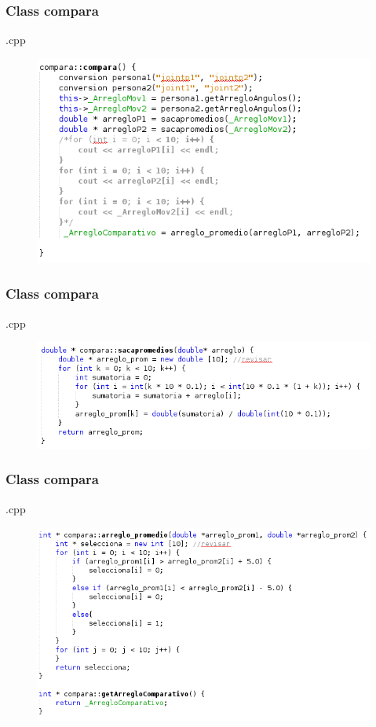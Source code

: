 \documentclass{beamer}
\begin{document}

\begin{frame}
\frametitle{Class compara}
.cpp
\begin{figure}
\includegraphics[width=0.7\linewidth]{20.png}
\end{figure}


\end{frame}


\begin{frame}
\frametitle{Class compara}
.cpp
\begin{figure}
\includegraphics[width=0.7\linewidth]{21.png}
\end{figure}


\end{frame}


\begin{frame}
\frametitle{Class compara}
.cpp
\begin{figure}
\includegraphics[width=0.7\linewidth]{22.png}
\end{figure}


\end{frame}
\end{document}
